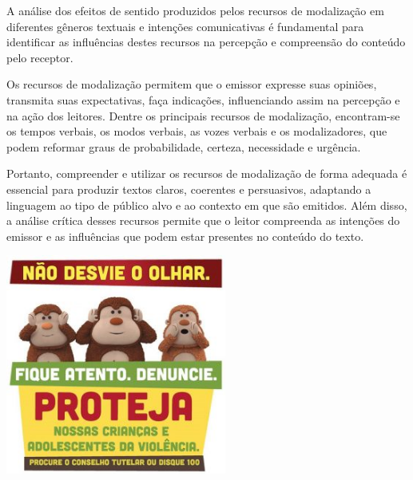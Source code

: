 {{A análise dos efeitos de sentido produzidos pelos recursos de
modalização em diferentes gêneros textuais e intenções comunicativas é
fundamental para identificar as influências destes recursos na percepção
e compreensão do conteúdo pelo receptor.

Os recursos de modalização permitem que o emissor expresse suas
opiniões, transmita suas expectativas, faça indicações, influenciando
assim na percepção e na ação dos leitores. Dentre os principais recursos
de modalização, encontram-se os tempos verbais, os modos verbais, as
vozes verbais e os modalizadores, que podem reformar graus de
probabilidade, certeza, necessidade e urgência.

Portanto, compreender e utilizar os recursos de modalização de forma
adequada é essencial para produzir textos claros, coerentes e
persuasivos, adaptando a linguagem ao tipo de público alvo e ao contexto
em que são emitidos. Além disso, a análise crítica desses recursos
permite que o leitor compreenda as intenções do emissor e as influências
que podem estar presentes no conteúdo do texto.}



\includegraphics[width=2.85536in,height=2.85536in]{./imgSAEB_7_POR/media/image9.png}

}
